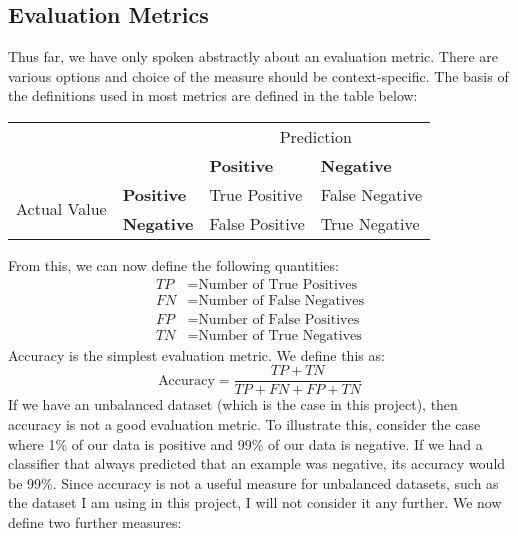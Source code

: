 \documentclass[12pt,a4paper,twoside,openright]{report}
\begin{document}
\subsection{Evaluation Metrics} \label{evaluation-metrics}
Thus far, we have only spoken abstractly about an evaluation metric. There are various options and choice of the measure should be context-specific. The basis of the definitions used in most metrics are defined in the table below:
\FloatBarrier
\begin{table}[]
	\centering
	\label{true-positive-table}
	\begin{tabular}{llll}
		&                                                                    & \multicolumn{2}{c}{Prediction} \\
		& \multicolumn{1}{l|}{}                                              & \textbf{Positive}  & \textbf{Negative}  \\ \cline{2-4} 
		\multirow{2}{*}{Actual Value}&\multicolumn{1}{l|}{\textbf{Positive}} & True Positive      & False Negative     \\
		& \multicolumn{1}{l|}{\textbf{Negative}}                             & False Positive     & True Negative     
	\end{tabular}
\end{table}
\FloatBarrier
From this, we can now define the following quantities:
\begin{align}
	TP & = \text{Number of True Positives} \\
	FN & = \text{Number of False Negatives} \\
	FP & = \text{Number of False Positives} \\
	TN & = \text{Number of True Negatives}
\end{align}
Accuracy is the simplest evaluation metric. We define this as:
\begin{equation}
	\text{Accuracy} = \frac{TP + TN}{TP + FN + FP + TN}
\end{equation}
If we have an unbalanced dataset (which is the case in this project), then accuracy is not a good evaluation metric. To illustrate this, consider the case where 1\% of our data is positive and 99\% of our data is negative. If we had a classifier that always predicted that an example was negative, its accuracy would be 99\%. Since accuracy is not a useful measure for unbalanced datasets, such as the dataset I am using in this project, I will not consider it any further.
\newline
\newline
We now define two further measures:
\end{document}
